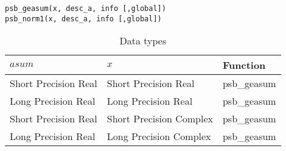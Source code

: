 \begin{verbatim}
psb_geasum(x, desc_a, info [,global])
psb_norm1(x, desc_a, info [,global])
\end{verbatim}

\begin{table}[h]
\begin{center}
\begin{tabular}{lll}
\hline
$asum$ & $x$ & {\bf Function}\\
\hline
Short Precision Real&Short Precision Real & psb\_geasum \\
Long Precision Real&Long Precision Real & psb\_geasum \\
Short Precision Real&Short Precision Complex & psb\_geasum \\
Long Precision Real&Long Precision Complex & psb\_geasum \\
\hline
\end{tabular}
\end{center}
\caption{Data types\label{tab:f90asum}}
\end{table}

